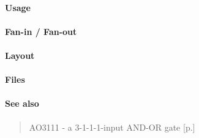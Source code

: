 \paragraph{Usage}

\paragraph{Fan-in / Fan-out}

\paragraph{Layout}

\paragraph{Files}

\paragraph{See also}
\begin{quote}
    AO3111 - a 3-1-1-1-input AND-OR gate [p.\pageref{AO3111}]
\end{quote}

